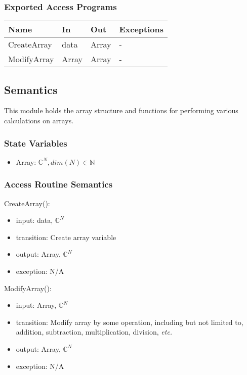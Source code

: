 \documentclass[12pt, titlepage]{article}
\begin{document}
\subsubsection{Exported Access Programs}

\begin{center}
    \begin{tabular}{p{2cm} p{4cm} p{4cm} p{2cm}}
        \hline
        \textbf{Name} & \textbf{In} & \textbf{Out} & \textbf{Exceptions} \\
        \hline
        CreateArray & data & Array & - \\
        ModifyArray & Array & Array & - \\
        \hline
    \end{tabular}
\end{center}

\subsection{Semantics}
This module holds the array structure and functions for performing various
calculations on arrays.

\subsubsection{State Variables}
\begin{itemize}
    \item Array: $\mathbb{C}^N, dim(N) \in \mathbb{N}$
\end{itemize}

\subsubsection{Access Routine Semantics}

\noindent CreateArray():
\begin{itemize}
    \item input: data, $\mathbb{C}^N$
    \item transition: Create array variable
    \item output: Array, $\mathbb{C}^N$
    \item exception: N/A
\end{itemize}

\noindent ModifyArray():
\begin{itemize}
    \item input: Array, $\mathbb{C}^N$
    \item transition: Modify array by some operation, including but not limited
    to, addition, subtraction, multiplication, division, \textit{etc.}
    \item output: Array, $\mathbb{C}^N$
    \item exception: N/A
\end{itemize}
\end{document}
